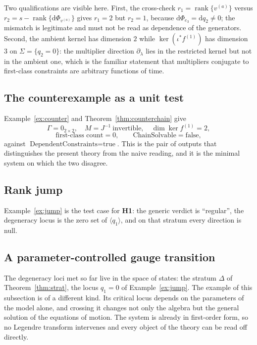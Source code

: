 \documentclass[12pt]{article}
\theoremstyle{plain}
\theoremstyle{definition}
\theoremstyle{remark}
\DeclareMathOperator{\rank}{rank}
\newcommand{\dd}{\mathrm{d}}
\newcommand{\gen}[1]{\langle #1\rangle}
\begin{document}
	Two qualifications are visible here. First, the cross-check
	$r_{1}=\rank\{v^{(a)}\}$ versus $r_{2}=s-\rank\{\dd\Phi_{v^{(a)}}\}$ gives
	$r_{1}=2$ but $r_{2}=1$, because $\dd\Phi_{e_{3}}=\dd q_{2}\neq0$; the mismatch
	is legitimate and must not be read as dependence of the generators. Second, the
	ambient kernel has dimension $2$ while $\ker(\iota^{*}f^{(1)})$ has dimension
	$3$ on $\Sigma=\{q_{2}=0\}$: the multiplier direction $\partial_{\lambda}$ lies
	in the restricted kernel but not in the ambient one, which is the familiar
	statement that multipliers conjugate to first-class constraints are arbitrary
	functions of time.
	
	\subsection{The counterexample as a unit test}
	
	Example~\ref{ex:counter} and Theorem~\ref{thm:counterchain} give
	\[
	\Gamma=0_{2\times2},\quad
	M=J^{-1}\ \text{invertible},\quad
	\dim\ker f^{(1)}=2,
	\]
	\[
	\text{first-class count}=0,\qquad
	\text{ChainSolvable}=\text{false},
	\]
	against $\text{DependentConstraints}=\text{true}$. This is the pair of outputs
	that distinguishes the present theory from the naive reading, and it is the
	minimal system on which the two disagree.
	
	\subsection{Rank jump}
	
	Example~\ref{ex:jump} is the test case for \textbf{H1}: the generic verdict is
	``regular'', the degeneracy locus is the zero set of $\gen{q_{1}}$, and on that
	stratum every direction is null.
	
	\subsection{A parameter-controlled gauge transition}
	\label{sec:paramgauge}
	
	The degeneracy loci met so far live in the space of states: the stratum
	$\Delta$ of Theorem~\ref{thm:strat}, the locus $q_{1}=0$ of
	Example~\ref{ex:jump}. The example of this subsection is of a different kind.
	Its critical locus depends on the parameters of the model alone, and crossing
	it changes not only the algebra but the general solution of the equations of
	motion. The system is already in first-order form, so no Legendre transform
	intervenes and every object of the theory can be read off directly.
	
\end{document}
